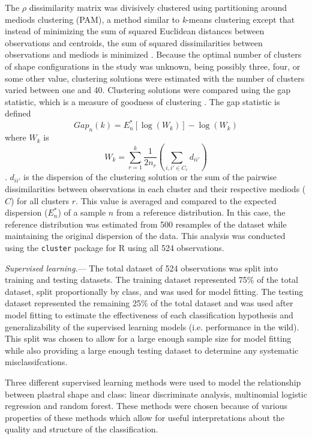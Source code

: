 \documentclass[12pt,letterpaper]{article}\usepackage{graphicx, color}
\renewcommand{\subsubsection}[1]{%
\vspace{2ex}
\noindent
\textit{#1.}---}
\begin{document}
The \(\rho\) dissimilarity matrix was divisively clustered using partitioning around mediods clustering (PAM), a method similar to \textit{k}-means clustering except that instead of minimizing the sum of squared Euclidean distances between observations and centroids, the sum of squared dissimilarities between observations and mediods is minimized \citep{Kaufman1990}.
Because the optimal number of clusters of shape configurations in the study was unknown, being possibly three, four, or some other value, clustering solutions were estimated with the number of clusters varied between one and 40. Clustering solutions were compared using the gap statistic, which is a measure of goodness of clustering \citep{Tibshirani2001a}. The gap statistic is defined
\[Gap_{n}(k) = E^{*}_{n}[\log(W_{k})] - \log(W_{k})\] 
where \(W_{k}\) is
\[W_{k} = \sum^{k}_{r = 1}{\frac{1}{2n_{r}} (\sum_{i,i' \in C_{r}} d_{ii'})}\].
\(d_{ii'}\) is the dispersion of the clustering solution or the sum of the pairwise dissimilarities between observations in each cluster and their respective mediods (\(C\)) for all clusters \(r\). This value is averaged and compared to the expected dispersion (\(E^{*}_{n}\)) of a sample \(n\) from a reference distribution. In this case, the reference distribution was estimated from 500 resamples of the dataset while maintaining the original dispersion of the data.
This analysis was conducted using the \texttt{cluster} package for R \citep{Maechler2013} using all 524 observations.

\subsubsection{Supervised learning}
The total dataset of 524 observations was split into training and testing datasets. The training dataset represented 75\% of the total dataset, split proportionally by class, and was used for model fitting. The testing dataset represented the remaining 25\% of the total dataset and  was used after model fitting to estimate the effectiveness of each classification hypothesis and generalizability of the supervised learning models (i.e. performance in the wild). This split was chosen to allow for a large enough sample size for model fitting while also providing a large enough testing dataset to determine any systematic misclassifcations.

Three different supervised learning methods were used to model the relationship between plastral shape and class: linear discriminate analysis, multinomial logistic regression and random forest. These methods were chosen because of various properties of these methods which allow for useful interpretations about the quality and structure of the classification.
\end{document}
